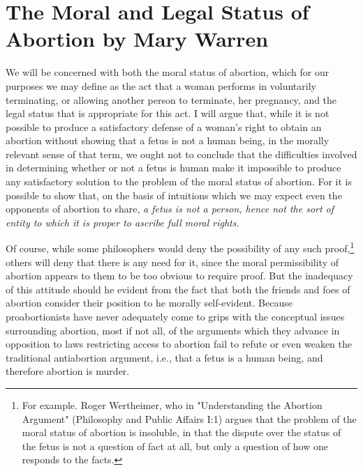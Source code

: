 \chapter{The Moral and Legal Status of Abortion by Mary Warren}\autocite{Warren1}
We will be concerned with both the moral status of
abortion, which for our purposes we may define as the act
that a woman performs in voluntarily terminating, or
allowing another person to terminate, her pregnancy, and
the legal status that is appropriate for this act. I will argue
that, while it is not possible to produce a satisfactory
defense of a woman’s right to obtain an abortion without
showing that a fetus is not a human being, in the morally
relevant sense of that term, we ought not to conclude that
the difficulties involved in determining whether or not a
fetus is human make it impossible to produce any
satisfactory solution to the problem of the moral status of
abortion. For it is possible to show that, on the basis of
intuitions which we may expect even the opponents of
abortion to share, \emph{a fetus is not a person, hence not the
sort of entity to which it is proper to ascribe full moral
rights.}

Of course, while some philosophers would deny the
possibility of any such proof,\footnote{For example. Roger Wertheimer, who in "Understanding the
Abortion Argument" (Philosophy and Public Affairs I:1) argues
that the problem of the moral status of abortion is insoluble, in
that the dispute over the status of the fetus is not a question of
fact at all, but only a question of how one responds to the facts.} others will deny that there
is any need for it, since the moral permissibility of
abortion appears to them to be too obvious to require
proof. But the inadequacy of this attitude should he
evident from the fact that both the friends and foes of
abortion consider their position to he morally self-evident.
Because proabortionists have never adequately come to
grips with the conceptual issues surrounding abortion,
most if not all, of the arguments which they advance in
opposition to laws restricting access to abortion fail to
refute or even weaken the traditional antiabortion
argument, i.e., that a fetus is a human being, and therefore
abortion is murder.

